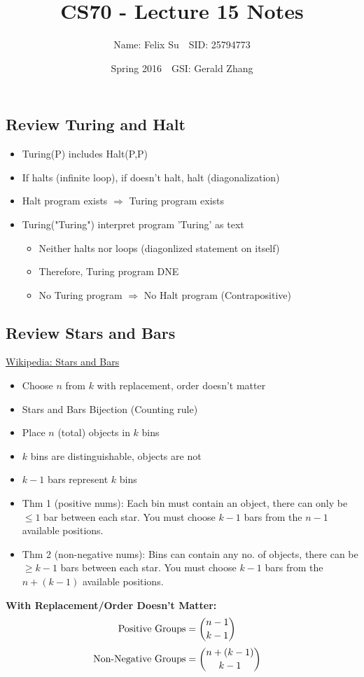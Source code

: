 \documentclass{article}\usepackage{amsmath,amssymb,amsthm,tikz,tkz-graph,color,chngpage,soul,hyperref,csquotes,graphicx,floatrow, listings}\newcommand*{\QEDB}{\hfill\ensuremath{\square}}\newtheorem*{prop}{Proposition}\renewcommand{\theenumi}{\alph{enumi}}\usepackage[shortlabels]{enumitem}\usepackage[nobreak=true]{mdframed}\usetikzlibrary{matrix,calc}\MakeOuterQuote{"}\usepackage[margin=0.75in]{geometry} \newtheorem{theorem}{Theorem}\newcommand{\Z}{\mathbb Z}\newcommand{\R}{\mathbb R}\newcommand{\Q}{\mathbb Q}\newcommand{\N}{\mathbb N}\newcommand{\x}[1]{\textrm{#1}}
\title{CS70 - Lecture 15 Notes}
\author{Name: Felix Su$\quad$SID: 25794773}
\date{Spring 2016$\quad$GSI: Gerald Zhang}
\begin{document}
\maketitle

\subsection*{Review Turing and Halt}
\begin{itemize}
    \item Turing(P) includes Halt(P,P)
    \item If halts (infinite loop), if doesn't halt, halt (diagonalization)
    \item Halt program exists $\Rightarrow$ Turing program exists
    \item Turing("Turing") interpret program 'Turing' as text
    \begin{itemize}
        \item Neither halts nor loops (diagonlized statement on itself)
        \item Therefore, Turing program DNE
        \item No Turing program $\Rightarrow$ No Halt program (Contrapositive)
    \end{itemize}
\end{itemize}
\subsection*{Review Stars and Bars}
\href{https://en.wikipedia.org/wiki/Stars_and_bars_%28combinatorics%29}{Wikipedia: Stars and Bars}
\begin{itemize}
    \item Choose $n$ from $k$ with replacement, order doesn't matter
    \item Stars and Bars Bijection (Counting rule)
    \item Place $n$ (total) objects in $k$ bins
    \item $k$ bins are distinguishable, objects are not
    \item $k-1$ bars represent $k$ bins
    \item Thm 1 (positive nums): Each bin must contain an object, there can only be $\le 1$ bar between each star. You must choose $k-1$ bars from the $n-1$ available positions.
    \item Thm 2 (non-negative nums): Bins can contain any no. of objects, there can be $\ge k-1$ bars between each star. You must choose $k-1$ bars from the $n+(k-1)$ available positions.
\end{itemize}
\begin{mdframed}
\textbf{With Replacement/Order Doesn't Matter:}
\begin{align}\textrm{Positive Groups} &= \dbinom{n-1}{k-1}\end{align}
\begin{align}\textrm{Non-Negative Groups} &= \dbinom{n+(k-1)}{k-1}\end{align}
\end{mdframed}
\end{document}
